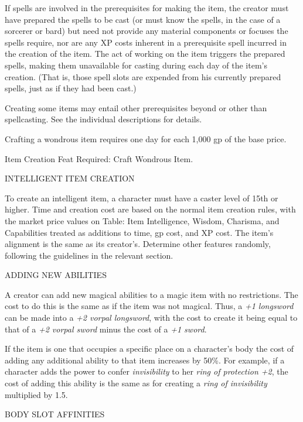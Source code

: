 \documentclass{article}
\begin{document}
If spells are involved in the prerequisites for making the item, the creator must 
have prepared the spells to be cast (or must know the spells, in the case of a 
sorcerer or bard) but need not provide any material components or focuses the spells 
require, nor are any XP costs inherent in a prerequisite spell incurred in the 
creation of the item. The act of working on the item triggers the prepared spells, 
making them unavailable for casting during each day of the item's creation. (That 
is, those spell slots are expended from his currently prepared spells, just as 
if they had been cast.)

Creating some items may entail other prerequisites beyond or other than spellcasting. 
See the individual descriptions for details.

Crafting a wondrous item requires one day for each 1,000 gp of the base price.

Item Creation Feat Required: Craft Wondrous Item.

\vspace{12pt}
{\large{}INTELLIGENT ITEM CREATION}

To create an intelligent item, a character must have a caster level of 15th or 
higher. Time and creation cost are based on the normal item creation rules, with 
the market price values on Table: Item Intelligence, Wisdom, Charisma, and Capabilities 
treated as additions to time, gp cost, and XP cost. The item's alignment is the 
same as its creator's. Determine other features randomly, following the guidelines 
in the relevant section.

\vspace{12pt}
{\large{}ADDING NEW ABILITIES}

A creator can add new magical abilities to a magic item with no restrictions. The 
cost to do this is the same as if the item was not magical. Thus, a \textit{+1 
longsword }can be made into a \textit{+2 vorpal longsword}, with the cost to create 
it being equal to that of a \textit{+2 vorpal sword }minus the cost of a \textit{+1 
sword}.

If the item is one that occupies a specific place on a character's body the cost 
of adding any additional ability to that item increases by 50\%. For example, if 
a character adds the power to confer \textit{invisibility }to her \textit{ring 
of protection +2}, the cost of adding this ability is the same as for creating 
a \textit{ring of invisibility }multiplied by 1.5.

\vspace{12pt}
BODY SLOT AFFINITIES
\end{document}
